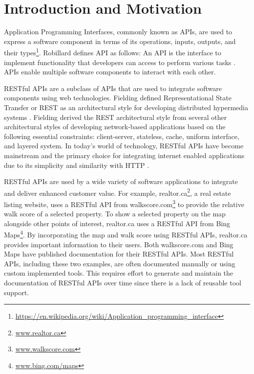\documentclass[11pt,oneside]{book}
\begin{document}
\mainmatter




\chapter{Introduction and Motivation}

Application Programming Interfaces, commonly known as APIs, are used to express a software component in terms of its operations, inputs, outputs, and their types\footnote{\url{https://en.wikipedia.org/wiki/Application_programming_interface}}. Robillard defines API as follows: An API is the interface to implement functionality that developers can access to perform various tasks \cite{Robillard_a_field_study} \cite{Robillard_what_makes}. APIs enable multiple software components to interact with each other.

RESTful APIs are a subclass of APIs that are used to integrate software components using web technologies. Fielding defined Representational State Transfer or REST as an architectural style for developing distributed hypermedia systems \cite{Fielding_rest}. Fielding derived the REST architectural style from several other architectural styles of developing network-based applications based on the following essential constraints: client-server, stateless, cache, uniform interface, and layered system. In today’s world of technology, RESTful APIs have become mainstream and the primary choice for integrating internet enabled applications due to its simplicity and similarity with HTTP \cite{mangler2010origin}.

RESTful APIs are used by a wide variety of software applications to integrate and deliver enhanced customer value. For example, realtor.ca\footnote{\url{www.realtor.ca}}, a real estate listing website, uses a RESTful API from walkscore.com\footnote{\url{www.walkscore.com}} to provide the relative walk score of a selected property. To show a selected property on the map alongside other points of interest,  realtor.ca uses a RESTful API from Bing Maps\footnote{\url{www.bing.com/maps}}. By incorporating the map and walk score using RESTful APIs, realtor.ca provides important information to their users. Both walkscore.com and Bing Maps have published documentation for their RESTful APIs. Most RESTful APIs, including these two examples, are often documented manually or using custom implemented tools. This requires effort to generate and maintain the documentation of RESTful APIs over time since there is a lack of reusable tool support.
\end{document}
